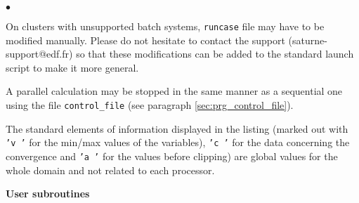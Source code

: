 {{{\begin{list}{$\bullet$}{}
\item On clusters with unsupported batch systems,
      \texttt{runcase} file may have to be modified manually.
      Please do not hesitate to contact the \CS support
      (saturne-support@edf.fr) so that these modifications can be added to
      the standard launch script to make it more general.

\item A parallel calculation may be stopped in the same manner as a
      sequential one using the file \texttt{control\_file} (see paragraph
      \ref{sec:prg_control_file}).

\item The standard elements of information displayed in the listing
      (marked out with \texttt{'v  '} for the min/max values of the
      variables), \texttt{'c  '} for the data concerning the convergence
      and \texttt{'a  '} for the values before clipping) are global
      values for the whole domain and not related to each processor.

\end{list}

\vspace{0.5cm}
{\bf User subroutines}

}}}
